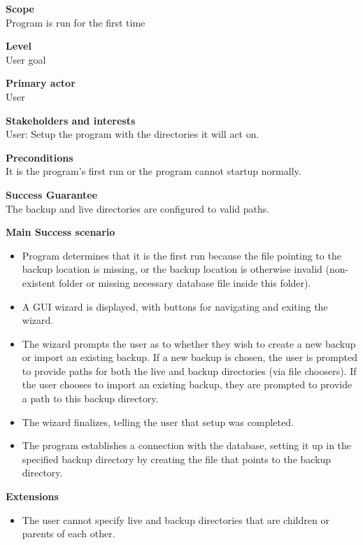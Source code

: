 \documentclass[12pt,a4paper]{article}
\begin{document}
\begin{description}
	\item \textbf{Scope} \\
		Program is run for the first time 
	\item \textbf{Level} \\
		User goal
	\item \textbf{Primary actor} \\
		User 
	\item \textbf{Stakeholders and interests} \\
		User: Setup the program with the directories it will act on.
	\item \textbf{Preconditions} \\
		It is the program's first run or the program cannot startup normally. 
	\item \textbf{Success Guarantee} \\
		The backup and live directories are configured to valid paths.
	\item \textbf{Main Success scenario} \vspace{-4ex} \\
	\begin{itemize}
		\item Program determines that it is the first run because the file pointing to the backup location is missing, or the backup location is otherwise invalid (non-existent folder or missing necessary database file inside this folder). 
		\item A GUI wizard is displayed, with buttons for navigating and exiting the wizard. 
		\item The wizard prompts the user as to whether they wish to create a new backup or import an existing backup. 
				If a new backup is chosen, the user is prompted to provide paths for both the live and backup directories (via file choosers). 
				If the user chooses to import an existing backup, they are prompted to provide a path to this backup directory. 
		\item The wizard finalizes, telling the user that setup was completed. 
		\item The program establishes a connection with the database, setting it up in the specified backup directory by creating the file that points to the backup directory. 
	\end{itemize}
	\item \textbf{Extensions} \\
	\begin{itemize}
		\item The user cannot specify live and backup directories that are children or parents of each other. 

\end{itemize}
\end{description}
\end{document}
